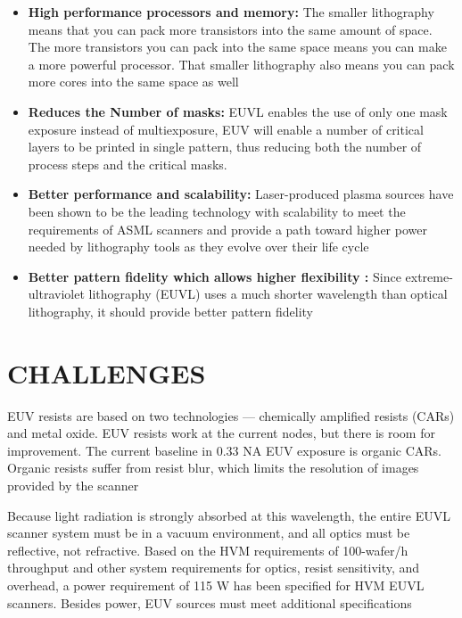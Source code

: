 \documentclass[12pt,a4paper]{report}
\begin{document}
\begin{itemize}
  \item \textbf{High performance processors and memory: }The smaller 
  lithography means that you can pack more transistors into the 
  same amount of space. The more transistors you can pack into 
  the same space means you can make a more powerful processor. 
  That smaller lithography also means you can pack more 
  cores into the same space as well

  \item \textbf{Reduces the Number of masks: }EUVL enables the use 
  of only one mask exposure instead of multiexposure, EUV will 
  enable a number of critical layers to be printed in single 
  pattern, thus reducing both the number of process steps and 
  the critical masks.
  \item \textbf{Better performance and scalability: }Laser-produced 
  plasma sources have been shown to be the leading technology with 
  scalability to meet the requirements of ASML scanners and 
  provide a path toward higher power needed by lithography tools 
  as they evolve over their life cycle
  
  \item \textbf{Better pattern fidelity which allows higher flexibility : }Since extreme-ultraviolet lithography (EUVL) uses a much shorter wavelength than optical lithography, it should provide better pattern fidelity

\end{itemize}




 






\chapter{CHALLENGES}

EUV resists are based on two technologies — chemically amplified 
resists (CARs) and metal oxide. EUV resists work at the current 
nodes, but there is room for improvement.
The current baseline in 0.33 NA EUV exposure is organic CARs. 
Organic resists suffer from resist blur, which limits the 
resolution of images provided by the scanner


Because light radiation is strongly
absorbed at this wavelength, the entire EUVL scanner system must be in a vacuum
environment, and all optics must be reflective, not refractive. Based on the HVM
requirements of 100-wafer/h throughput and other system requirements for optics,
resist sensitivity, and overhead, a power requirement of 115 W has been
specified for HVM EUVL scanners. Besides power, EUV sources must meet additional specifications
\end{document}
